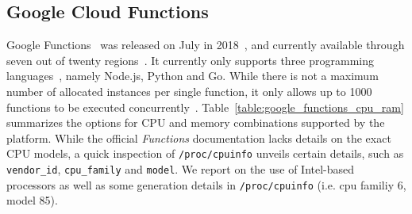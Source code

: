 \subsection{Google Cloud Functions}\label{sec:ss:google}
Google Functions~\cite{GoogleFunctions} was released on July in 2018~\cite{GoogleFunctionsReleases}, and currently available through seven out of twenty regions~\cite{GoogleFunctionsLocations}.
It currently only supports three programming languages~\cite{GoogleFunctionsLanguages}, namely Node.js, Python and Go. 
While there is not a maximum number of allocated instances per single function, it only allows up to 1000 functions to be executed concurrently~\cite{GoogleFunctionsQuotas}.
Table~\ref{table:google_functions_cpu_ram} summarizes the options for CPU and memory combinations supported by the platform\cite{GoogleFunctionsPricing}.
While the official \emph{Functions} documentation lacks details on the exact CPU models, a quick inspection of \texttt{/proc/cpuinfo} unveils certain details, such as \texttt{vendor\_id}, \texttt{cpu\_family} and \texttt{model}.
We report on the use of Intel-based processors as well as some generation details in \texttt{/proc/cpuinfo} (i.e. cpu familiy 6, model 85).

\begin{table}[!t]

\caption[Google Cloud Functions - Possible memory allocation and corresponding CPU frequency]{Google Cloud Functions - Possible memory allocation and corresponding CPU frequency~\cite{GoogleFunctionsPricing}.}
\centering
{}
\label{table:google_functions_cpu_ram}
\end{table}

